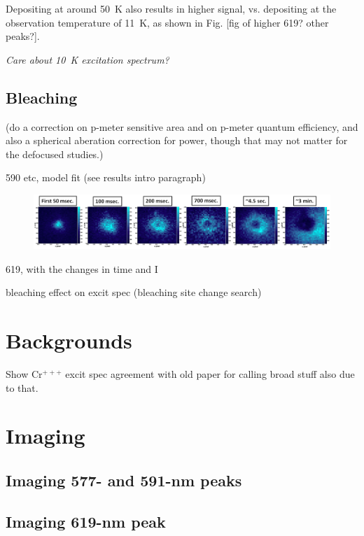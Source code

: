 Depositing at around 50~K also results in higher signal, vs. depositing at the observation temperature of 11~K, as shown in Fig. [fig of higher 619? other peaks?].

\emph{\color{gray}Care about 10~K excitation spectrum?}

\subsection{Bleaching}
\label{subsec:bleaching}

({\color{red}do a correction on p-meter sensitive area and on p-meter quantum efficiency, and also a spherical aberation correction for power, though that may not matter for the defocused studies.})

590 etc, model fit (see results intro paragraph)

\begin{figure} %
        \centering
                \includegraphics[width=.9\textwidth]{figures/hole_bleach_590.png}
                \caption{}
\label{fig:testfig}
\end{figure}

619, with the changes in time and I

bleaching effect on excit spec (bleaching site change search)

\section{Backgrounds}
\label{sec:bgs}

Show Cr$^{+++}$ excit spec agreement with old paper for calling broad stuff also due to that.

\section{Imaging}
\label{imaging}

\subsection{Imaging 577- and 591-nm peaks}

\subsection{Imaging 619-nm peak}

